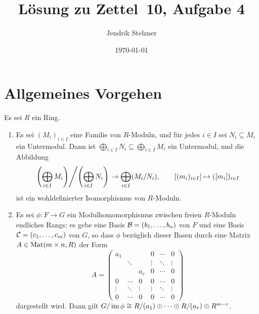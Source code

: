 \documentclass[a4paper,10pt,numbers=noenddot]{scrartcl}
\title{Lösung zu Zettel~10, Aufgabe 4}
\author{Jendrik Stelzner}
\date{\today}
\begin{document}
\maketitle





\section{Allgemeines Vorgehen}





\begin{lemma}
  \label{lemma: quotients via diagonal matrices}
  Es sei $R$ ein Ring.
  \begin{enumerate}
    \item
      Es sei $(M_i)_{i \in I}$ eine Familie von $R$-Moduln, und für jedes $i \in I$ sei $N_i \subseteq M_i$ ein Untermodul.
      Dann ist $\bigoplus_{i \in I} N_i \subseteq \bigoplus_{i \in I} M_i$ ein Untermodul, und die Abbildung
      \[
            \left. \left( \bigoplus_{i \in I} M_i \right) \middle/ \left( \bigoplus_{i \in I} N_i \right) \right.
        \to \bigoplus_{i \in I} (M_i / N_i),
        \qquad
        [(m_i)_{i \in I}] \mapsto ([m_i])_{i \in I}
      \]
      ist ein wohldefinierter Isomorphismus von $R$-Moduln.
    \item
      Es sei $\phi \colon F \to G$ ein Modulhomomorphismus zwischen freien $R$-Moduln endliches Rangs;
      es gebe eine Basis $\mathcal{B} = (b_1, \dotsc, b_n)$ von $F$ und eine Basis $\mathcal{C} = (c_1, \dotsc, c_m)$ von $G$, so dass $\phi$ bezüglich dieser Basen durch eine Matrix $A \in \operatorname{Mat}(m \times n, R)$ der Form
      \[
          A
        = \begin{pmatrix}
            a_1     &         &         & 0       & \cdots  & 0       \\
                    & \ddots  &         & \vdots  & \ddots  & \vdots  \\
                    &         & a_r     & 0       & \cdots  & 0       \\
            0       & \cdots  & 0       & 0       & \cdots  & 0       \\
            \vdots  & \ddots  & \vdots  & \vdots  & \ddots  & \vdots  \\
            0       & \cdots  & 0       & 0       & \cdots  & 0
          \end{pmatrix}
      \]
      dargestellt wird.
      Dann gilt $G / \operatorname{im} \phi \cong R/(a_1) \oplus \dotsb \oplus R/(a_r) \oplus R^{m-r}$.
  \end{enumerate}
\end{lemma}
\end{document}
